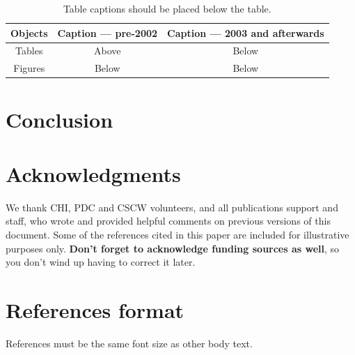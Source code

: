\documentclass{sigchi}
\newcommand\tabhead[1]{\small\textbf{#1}}
\begin{document}
\begin{table}
  \centering
  \begin{tabular}{|c|c|c|}
    \hline
    \tabhead{Objects} &
    \multicolumn{1}{|p{0.3\columnwidth}|}{\centering\tabhead{Caption --- pre-2002}} &
    \multicolumn{1}{|p{0.4\columnwidth}|}{\centering\tabhead{Caption --- 2003 and afterwards}} \\
    \hline
    Tables & Above & Below \\
    \hline
    Figures & Below & Below \\
    \hline
  \end{tabular}
  \caption{Table captions should be placed below the table.}
  \label{tab:table1}
\end{table}



\section{Conclusion}

\section{Acknowledgments}

We thank CHI, PDC and CSCW volunteers, and all publications support
and staff, who wrote and provided helpful comments on previous
versions of this document.  Some of the references cited in this paper
are included for illustrative purposes only.  \textbf{Don't forget
to acknowledge funding sources as well}, so you don't wind up
having to correct it later.

%
%
%
%
%
\balance

\section{References format}
References must be the same font size as other body text.



\end{document}
